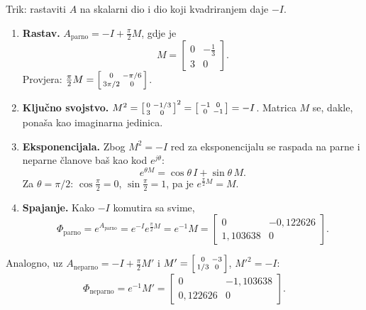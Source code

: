 \begin{korak}
Trik: rastaviti $A$ na skalarni dio i dio koji kvadriranjem daje $-I$.
\begin{enumerate}[leftmargin=*]
  \item \textbf{Rastav.} $A_{\mathrm{parno}} = -I + \frac{\pi}{2}M$, gdje je
        \[
          M = \begin{bmatrix} 0 & -\tfrac13 \\ 3 & 0 \end{bmatrix}.
        \]
        Provjera: $\frac{\pi}{2}M = \begin{bsmallmatrix} 0 & -\pi/6 \\ 3\pi/2 & 0\end{bsmallmatrix}$. \checkmark
  \item \textbf{Ključno svojstvo.}
        $M^2 = \begin{bsmallmatrix} 0 & -1/3 \\ 3 & 0\end{bsmallmatrix}^2
             = \begin{bsmallmatrix} -1 & 0 \\ 0 & -1\end{bsmallmatrix} = -I$.
        Matrica $M$ se, dakle, ponaša kao imaginarna jedinica.
  \item \textbf{Eksponencijala.} Zbog $M^2 = -I$ red za eksponencijalu se
        raspada na parne i neparne članove baš kao kod $e^{j\theta}$:
        \[
          e^{\theta M} = \cos\theta\, I + \sin\theta\, M .
        \]
        Za $\theta = \pi/2$: $\cos\frac{\pi}{2} = 0$, $\sin\frac{\pi}{2} = 1$, pa
        je $e^{\frac{\pi}{2}M} = M$.
  \item \textbf{Spajanje.} Kako $-I$ komutira sa svime,
        \[
          \Phi_{\mathrm{parno}} = e^{A_{\mathrm{parno}}} = e^{-I}e^{\frac{\pi}{2}M}
          = e^{-1} M
          = \begin{bmatrix} 0 & -0{,}122626 \\ 1{,}103638 & 0 \end{bmatrix}.
        \]
\end{enumerate}
\end{korak}

Analogno, uz $A_{\mathrm{neparno}} = -I + \frac{\pi}{2}M'$ i
$M' = \begin{bsmallmatrix} 0 & -3 \\ 1/3 & 0\end{bsmallmatrix}$, $M'^2 = -I$:
\begin{equation}
\Phi_{\mathrm{neparno}} = e^{-1}M' = \begin{bmatrix} 0 & -1{,}103638 \\ 0{,}122626 & 0 \end{bmatrix}.
\end{equation}

